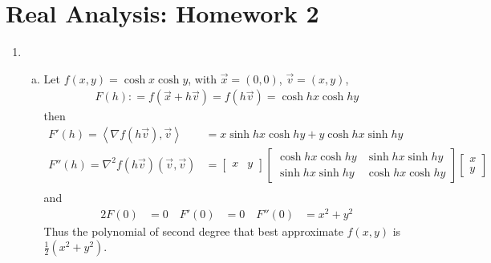 \documentclass[a4paper,12pt]{article}
\theoremstyle{definition}
\begin{document}
\section*{Real Analysis: Homework 2}

\begin{enumerate}

\item 
\begin{enumerate}[(a)]
\item Let $f(x,y) = \cosh x \cosh y$, with $\vec{x} = (0,0)$, $\vec{v}=(x,y)$,
\begin{align*}
F(h): = f(\vec{x}+h\vec{v}) = f(h\vec{v}) = \cosh hx\cosh hy
\end{align*}
then
\begin{align*}
F'(h)=\left\langle\nabla f(h\vec{v}),\vec{v}\right\rangle  &= x \sinh hx \cosh hy + y \cosh hx \sinh hy\\
F''(h)=\nabla^2 f(h\vec{v})(\vec{v},\vec{v})&=\begin{bmatrix}x & y\end{bmatrix}\begin{bmatrix}\cosh hx \cosh hy & \sinh hx \sinh hy \\ \sinh hx \sinh hy &\cosh hx \cosh hy \end{bmatrix}\begin{bmatrix}x \\ y\end{bmatrix}\\
\end{align*}
and 
\begin{alignat*}{2}
F(0) &= 0 \quad F'(0) &= 0 \quad  F''(0) &= x^2 + y^2
\end{alignat*}
Thus the polynomial of second degree that best approximate $f(x,y)$ is $\frac{1}{2}(x^2+y^2)$.


\end{enumerate}
\end{enumerate}
\end{document}
